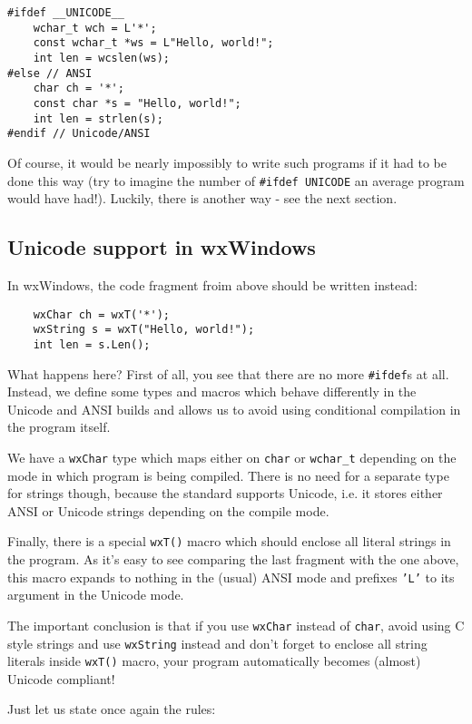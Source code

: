 \begin{verbatim}
#ifdef __UNICODE__
    wchar_t wch = L'*';
    const wchar_t *ws = L"Hello, world!";
    int len = wcslen(ws);
#else // ANSI
    char ch = '*';
    const char *s = "Hello, world!";
    int len = strlen(s);
#endif // Unicode/ANSI
\end{verbatim}

Of course, it would be nearly impossibly to write such programs if it had to
be done this way (try to imagine the number of {\tt \#ifdef UNICODE} an average
program would have had!). Luckily, there is another way - see the next
section.

\subsection{Unicode support in wxWindows}

In wxWindows, the code fragment froim above should be written instead:

\begin{verbatim}
    wxChar ch = wxT('*');
    wxString s = wxT("Hello, world!");
    int len = s.Len();
\end{verbatim}

What happens here? First of all, you see that there are no more {\tt \#ifdef}s
at all. Instead, we define some types and macros which behave differently in
the Unicode and ANSI builds and allows us to avoid using conditional
compilation in the program itself.

We have a {\tt wxChar} type which maps either on {\tt char} or {\tt wchar\_t} 
depending on the mode in which program is being compiled. There is no need for
a separate type for strings though, because the standard 
 supports Unicode, i.e. it stores either ANSI or
Unicode strings depending on the compile mode.

Finally, there is a special {\tt wxT()} macro which should enclose all literal
strings in the program. As it's easy to see comparing the last fragment with
the one above, this macro expands to nothing in the (usual) ANSI mode and
prefixes {\tt 'L'} to its argument in the Unicode mode.

The important conclusion is that if you use {\tt wxChar} instead of 
{\tt char}, avoid using C style strings and use {\tt wxString} instead and
don't forget to enclose all string literals inside {\tt wxT()} macro, your
program automatically becomes (almost) Unicode compliant!

Just let us state once again the rules:

